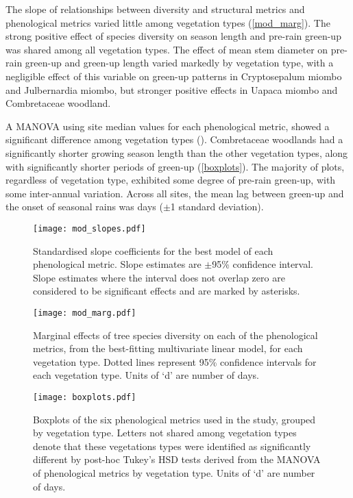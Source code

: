 \documentclass[11pt,a4paper]{article}
\begin{document}
The slope of relationships between diversity and structural metrics and
phenological metrics varied little among vegetation types (\autoref{mod_marg}).
The strong positive effect of species diversity on season length and pre-rain
green-up was shared among all vegetation types. The effect of mean stem
diameter on pre-rain green-up and green-up length varied markedly by vegetation
type, with a negligible effect of this variable on green-up patterns in
Cryptosepalum miombo and Julbernardia miombo, but stronger positive effects in
Uapaca miombo and Combretaceae woodland.
 
A MANOVA using site median values for each phenological metric, showed a
significant difference among vegetation types (\phenManova{}). Combretaceae
woodlands had a significantly shorter growing season length than the other
vegetation types, along with significantly shorter periods of green-up
(\autoref{boxplots}). The majority of plots, regardless of vegetation type,
exhibited some degree of pre-rain green-up, with some inter-annual variation.
Across all sites, the mean lag between green-up and the onset of seasonal rains
was \greenLagMean{} days ($\pm{}$1 standard deviation).

\begin{figure}[H]
\centering
	\texttt{[image: mod\_slopes.pdf]}
	\caption{Standardised slope coefficients for the best model of each
		phenological metric. Slope estimates are $\pm$95\% confidence interval.
		Slope estimates where the interval does not overlap zero are considered to be
		significant effects and are marked by asterisks.}
	\label{mod_slopes}
\end{figure}

\begin{figure}[H]
\centering
	\texttt{[image: mod\_marg.pdf]}
	\caption{Marginal effects of tree species diversity on each of the
		phenological metrics, from the best-fitting multivariate linear model, for
		each vegetation type. Dotted lines represent 95\% confidence intervals for each
		vegetation type. Units of `d' are number of days.}
	\label{mod_marg}
\end{figure}

\begin{figure}[H]
\centering
	\texttt{[image: boxplots.pdf]}
	\caption{Boxplots of the six phenological metrics used in the study,
		grouped by vegetation type. Letters not shared among vegetation types
		denote that these vegetations types were identified as significantly different
		by post-hoc Tukey's HSD tests derived from the MANOVA of phenological metrics
		by vegetation type. Units of `d' are number of days.}
	\label{boxplots}
\end{figure}
\end{document}
